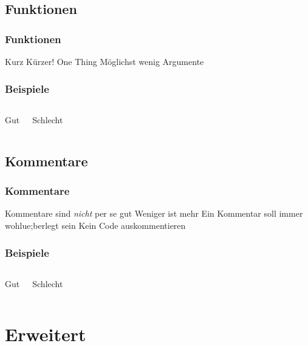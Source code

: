 \documentclass{beamer}
\begin{document}
\subsection{Funktionen}
\begin{frame}
    \frametitle{Funktionen}
    \begin{outline}
        \1 Kurz
        \1 Kürzer!
        \1 One Thing
        \1 Möglichst wenig Argumente
    \end{outline}
\end{frame}
\begin{frame}
    \frametitle{Beispiele}
    \begin{columns}[t]
        \begin{center}
            \huge \color{green} Gut
        \end{center}
        \begin{center}
            \huge \color{red} Schlecht
        \end{center}
    \end{columns}
\end{frame}

\subsection{Kommentare}
\begin{frame}
    \frametitle{Kommentare}
    \begin{outline}
        \1 Kommentare sind \emph{nicht} per se gut
        \1 Weniger ist mehr
        \1 Ein Kommentar soll immer wohlue;berlegt sein
        \1 Kein Code auskommentieren
    \end{outline}
\end{frame}
\begin{frame}
    \frametitle{Beispiele}
    \begin{columns}[t]
        \begin{center}
            \huge \color{green} Gut
        \end{center}
        \begin{center}
            \huge \color{red} Schlecht
        \end{center}
    \end{columns}
\end{frame}

\section{Erweitert}
\begin{frame}
    \tableofcontents[currentsection]
\end{frame}
\end{document}
